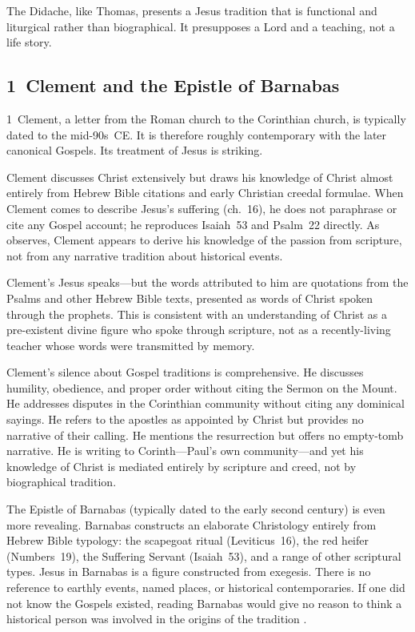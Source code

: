 \documentclass[12pt,oneside]{article}
\begin{document}
The Didache, like Thomas, presents a Jesus tradition that is functional
and liturgical rather than biographical.  It presupposes a Lord and a
teaching, not a life story.

\subsection{1~Clement and the Epistle of Barnabas}
\label{sec:noncanon:clement}

1~Clement, a letter from the Roman church to the Corinthian church,
is typically dated to the mid-90s~CE.  It is therefore roughly
contemporary with the later canonical Gospels.  Its treatment of Jesus
is striking.

Clement discusses Christ extensively but draws his knowledge of Christ
almost entirely from Hebrew Bible citations and early Christian creedal
formulae.  When Clement comes to describe Jesus's suffering (ch.~16),
he does not paraphrase or cite any Gospel account; he reproduces
Isaiah~53 and Psalm~22 directly.  As \citet{Doherty2009} observes,
Clement appears to derive his knowledge of the passion from scripture,
not from any narrative tradition about historical events.

Clement's Jesus speaks---but the words attributed to him are quotations
from the Psalms and other Hebrew Bible texts, presented as words of
Christ spoken through the prophets.  This is consistent with an
understanding of Christ as a pre-existent divine figure who spoke
through scripture, not as a recently-living teacher whose words were
transmitted by memory.

Clement's silence about Gospel traditions is comprehensive.  He
discusses humility, obedience, and proper order without citing the
Sermon on the Mount.  He addresses disputes in the Corinthian community
without citing any dominical sayings.  He refers to the apostles as
appointed by Christ but provides no narrative of their calling.  He
mentions the resurrection but offers no empty-tomb narrative.  He
is writing to Corinth---Paul's own community---and yet his knowledge of
Christ is mediated entirely by scripture and creed, not by biographical
tradition.

The Epistle of Barnabas (typically dated to the early second century)
is even more revealing.  Barnabas constructs an elaborate Christology
entirely from Hebrew Bible typology: the scapegoat ritual
(Leviticus~16), the red heifer (Numbers~19), the Suffering Servant
(Isaiah~53), and a range of other scriptural types.  Jesus in Barnabas
is a figure constructed from exegesis.  There is no reference to
earthly events, named places, or historical contemporaries.  If one did
not know the Gospels existed, reading Barnabas would give no reason to
think a historical person was involved in the origins of the tradition
\citep{Doherty2009}.
\end{document}
